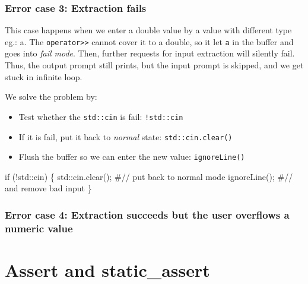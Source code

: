 \documentclass[
  letterpaper,
  DIV=11,
  numbers=noendperiod]{scrreprt}
\newenvironment{Shaded}{\begin{snugshade}}{\end{snugshade}}
\newcommand{\CommentTok}[1]{\textcolor[rgb]{0.37,0.37,0.37}{#1}}
\newcommand{\ControlFlowTok}[1]{\textcolor[rgb]{0.00,0.23,0.31}{#1}}
\newcommand{\FunctionTok}[1]{\textcolor[rgb]{0.28,0.35,0.67}{#1}}
\newcommand{\NormalTok}[1]{\textcolor[rgb]{0.00,0.23,0.31}{#1}}
\newcommand{\SpecialCharTok}[1]{\textcolor[rgb]{0.37,0.37,0.37}{#1}}
\providecommand{\tightlist}{%
  \setlength{\itemsep}{0pt}\setlength{\parskip}{0pt}}\usepackage{longtable,booktabs,array}
\begin{document}
\hypertarget{error-case-3-extraction-fails}{%
\subsubsection{Error case 3: Extraction
fails}\label{error-case-3-extraction-fails}}

This case happens when we enter a double value by a value with different
type eg.: a. The \texttt{operator\textgreater{}\textgreater{}} cannot
cover it to a double, so it let \texttt{a} in the buffer and goes into
\emph{fail mode}. Then, further requests for input extraction will
silently fail. Thus, the output prompt still prints, but the input
prompt is skipped, and we get stuck in infinite loop.

We solve the problem by:

\begin{itemize}
\tightlist
\item
  Test whether the \texttt{std::cin} is fail: \texttt{!std::cin}
\item
  If it is fail, put it back to \emph{normal} state:
  \texttt{std::cin.clear()}
\item
  Flush the buffer so we can enter the new value: \texttt{ignoreLine()}
\end{itemize}

\begin{Shaded}
\begin{Highlighting}[]
\ControlFlowTok{if}\NormalTok{ (}\SpecialCharTok{!}\NormalTok{std}\SpecialCharTok{::}\NormalTok{cin)}
\NormalTok{\{}
\NormalTok{    std}\SpecialCharTok{::}\FunctionTok{cin.clear}\NormalTok{();   }\CommentTok{\#// put back to normal mode}
    \FunctionTok{ignoreLine}\NormalTok{();       }\CommentTok{\#// and remove bad input}
\NormalTok{\}}
\end{Highlighting}
\end{Shaded}

\hypertarget{error-case-4-extraction-succeeds-but-the-user-overflows-a-numeric-value}{%
\subsubsection{Error case 4: Extraction succeeds but the user overflows
a numeric
value}\label{error-case-4-extraction-succeeds-but-the-user-overflows-a-numeric-value}}

\hypertarget{assert-and-static_assert}{%
\section{Assert and static\_assert}\label{assert-and-static_assert}}
\end{document}
